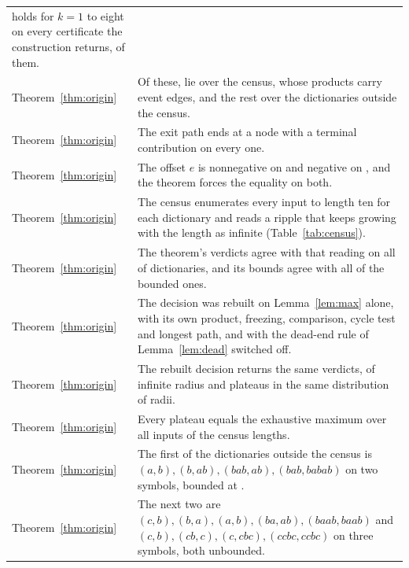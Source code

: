 \documentclass[11pt,a4paper]{article}
\theoremstyle{definition}
\theoremstyle{plain}
\begin{document}
{\begin{longtable}{@{}>{\raggedright\arraybackslash}p{}>{\raggedright\arraybackslash}p{}@{}}
holds for \(k = 1\) to eight on every certificate the construction returns, \LassoCertificates{} of them. \\
\addlinespace
{\footnotesize Theorem~\ref{thm:origin}} & Of these, \CertCertificates{} lie over the census, whose \CertProducts{}
products carry \CertEventEdges{} event edges, and the rest over the \HardCases{} dictionaries outside the census. \\
\addlinespace
{\footnotesize Theorem~\ref{thm:origin}} & The exit path ends at a node with a terminal contribution on every one. \\
\addlinespace
{\footnotesize Theorem~\ref{thm:origin}} & The offset \(e\) is nonnegative on \LassoNonneg{} and negative on
\LassoNegative{}, and the theorem forces the equality on both. \\
\addlinespace
{\footnotesize Theorem~\ref{thm:origin}} & The census enumerates every input to length ten for each dictionary and reads
a ripple that keeps growing with the length as infinite (Table~\ref{tab:census}). \\
\addlinespace
{\footnotesize Theorem~\ref{thm:origin}} & The theorem's verdicts agree with that reading on all \ProductAgree{} of
\CensusTotal{} dictionaries, and its bounds agree with all \ProductExact{} of the \CensusPlateaus{} bounded ones. \\
\addlinespace
{\footnotesize Theorem~\ref{thm:origin}} & The decision was rebuilt on Lemma~\ref{lem:max} alone, with its own product,
freezing, comparison, cycle test and longest path, and with the dead-end rule of Lemma~\ref{lem:dead} switched off. \\
\addlinespace
{\footnotesize Theorem~\ref{thm:origin}} & The rebuilt decision returns the same verdicts, \RepairedUnbounded{} of
infinite radius and \RepairedBounded{} plateaus in the same distribution of radii. \\
\addlinespace
{\footnotesize Theorem~\ref{thm:origin}} & Every plateau equals the exhaustive maximum over all inputs of the census
lengths. \\
\addlinespace
{\footnotesize Theorem~\ref{thm:origin}} & The first of the \HardCases{} dictionaries outside the census is
\((a,b), (b,ab), (bab,ab), (bab,babab)\) on two symbols, bounded at \HardBoundOne{}. \\
\addlinespace
{\footnotesize Theorem~\ref{thm:origin}} & The next two are \((c,b), (b,a), (a,b), (ba,ab), (baab,baab)\) and
\((c,b), (cb,c), (c,cbc), (ccbc,ccbc)\) on three symbols, both unbounded. \\

\end{longtable}}
\end{document}

